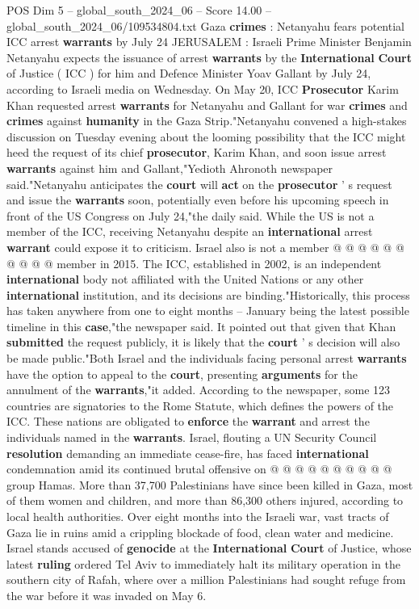\begin{textsample}{POS Dim 5 – global\_south\_2024\_06 – Score 14.00 – global\_south\_2024\_06/109534804.txt}  \label{ex:f5_pos_224}
Gaza \textbf{crimes} : Netanyahu fears potential ICC arrest \textbf{warrants} by July 24 JERUSALEM : Israeli Prime Minister Benjamin Netanyahu expects the issuance of arrest \textbf{warrants} by the \textbf{International} \textbf{Court} of Justice ( ICC ) for him and Defence Minister Yoav Gallant by July 24, according to Israeli media on Wednesday.
On May 20, ICC \textbf{Prosecutor} Karim Khan requested arrest \textbf{warrants} for Netanyahu and Gallant for war \textbf{crimes} and \textbf{crimes} against \textbf{humanity} in the Gaza Strip."Netanyahu convened a high-stakes discussion on Tuesday evening about the looming possibility that the ICC might heed the request of its chief \textbf{prosecutor}, Karim Khan, and soon issue arrest \textbf{warrants} against him and Gallant,"Yedioth Ahronoth newspaper said."Netanyahu anticipates the \textbf{court} will \textbf{act} on the \textbf{prosecutor} ' s request and issue the \textbf{warrants} soon, potentially even before his upcoming speech in front of the US Congress on July 24,"the daily said.
While the US is not a member of the ICC, receiving Netanyahu despite an \textbf{international} arrest \textbf{warrant} could expose it to criticism.
Israel also is not a member @ @ @ @ @ @ @ @ @ @ member in 2015.
The ICC, established in 2002, is an independent \textbf{international} body not affiliated with the United Nations or any other \textbf{international} institution, and its decisions are binding."Historically, this process has taken anywhere from one to eight months -- January being the latest possible timeline in this \textbf{case},"the newspaper said.
It pointed out that given that Khan \textbf{submitted} the request publicly, it is likely that the \textbf{court} ' s decision will also be made public."Both Israel and the individuals facing personal arrest \textbf{warrants} have the option to appeal to the \textbf{court}, presenting \textbf{arguments} for the annulment of the \textbf{warrants},"it added.
According to the newspaper, some 123 countries are signatories to the Rome Statute, which defines the powers of the ICC.
These nations are obligated to \textbf{enforce} the \textbf{warrant} and arrest the individuals named in the \textbf{warrants}.
Israel, flouting a UN Security Council \textbf{resolution} demanding an immediate cease-fire, has faced \textbf{international} condemnation amid its continued brutal offensive on @ @ @ @ @ @ @ @ @ @ group Hamas.
More than 37,700 Palestinians have since been killed in Gaza, most of them women and children, and more than 86,300 others injured, according to local health authorities.
Over eight months into the Israeli war, vast tracts of Gaza lie in ruins amid a crippling blockade of food, clean water and medicine.
Israel stands accused of \textbf{genocide} at the \textbf{International} \textbf{Court} of Justice, whose latest \textbf{ruling} ordered Tel Aviv to immediately halt its military operation in the southern city of Rafah, where over a million Palestinians had sought refuge from the war before it was invaded on May 6.

\end{textsample}
